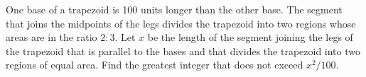 One base of a trapezoid is 100 units longer than the other base.  The segment that joins the midpoints of the legs divides the trapezoid into two regions whose areas are in the ratio $2: 3.$  Let $x$ be the length of the segment joining the legs of the trapezoid that is parallel to the bases and that divides the trapezoid into two regions of equal area.  Find the greatest integer that does not exceed $x^2/100.$